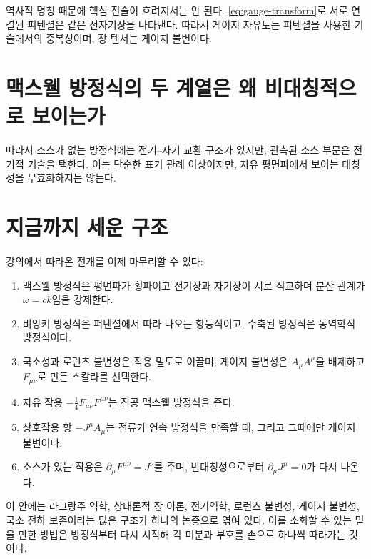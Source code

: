 역사적 명칭 때문에 핵심 진술이 흐려져서는 안 된다. \eqref{eq:gauge-transform}로 서로 연결된 퍼텐셜은 같은 전자기장을 나타낸다. 따라서 게이지 자유도는 퍼텐셜을 사용한 기술에서의 중복성이며, 장 텐서는 게이지 불변이다.

\section{맥스웰 방정식의 두 계열은 왜 비대칭적으로 보이는가}

\begin{classroomqa}\end{classroomqa}

따라서 소스가 없는 방정식에는 전기--자기 교환 구조가 있지만, 관측된 소스 부문은 전기적 기술을 택한다. 이는 단순한 표기 관례 이상이지만, 자유 평면파에서 보이는 대칭성을 무효화하지는 않는다.

\section{지금까지 세운 구조}

강의에서 따라온 전개를 이제 마무리할 수 있다:
\begin{enumerate}
\item 맥스웰 방정식은 평면파가 횡파이고 전기장과 자기장이 서로 직교하며 분산 관계가 \(\omega=ck\)임을 강제한다.
\item 비앙키 방정식은 퍼텐셜에서 따라 나오는 항등식이고, 수축된 방정식은 동역학적 방정식이다.
\item 국소성과 로런츠 불변성은 작용 밀도로 이끌며, 게이지 불변성은 \(A_\mu A^\mu\)을 배제하고 \(F_{\mu\nu}\)로 만든 스칼라를 선택한다.
\item 자유 작용
      \(-\tfrac14F_{\mu\nu}F^{\mu\nu}\)는 진공 맥스웰 방정식을 준다.
\item 상호작용 항 \(-J^\mu A_\mu\)는 전류가 연속 방정식을 만족할 때, 그리고 그때에만 게이지 불변이다.
\item 소스가 있는 작용은
      \(\partial_\mu F^{\mu\nu}=J^\nu\)를 주며, 반대칭성으로부터
      \(\partial_\mu J^\mu=0\)가 다시 나온다.
\end{enumerate}

이 안에는 라그랑주 역학, 상대론적 장 이론, 전기역학, 로런츠 불변성, 게이지 불변성, 국소 전하 보존이라는 많은 구조가 하나의 논증으로 엮여 있다. 이를 소화할 수 있는 믿을 만한 방법은 방정식부터 다시 시작해 각 미분과 부호를 손으로 하나씩 따라가는 것이다.